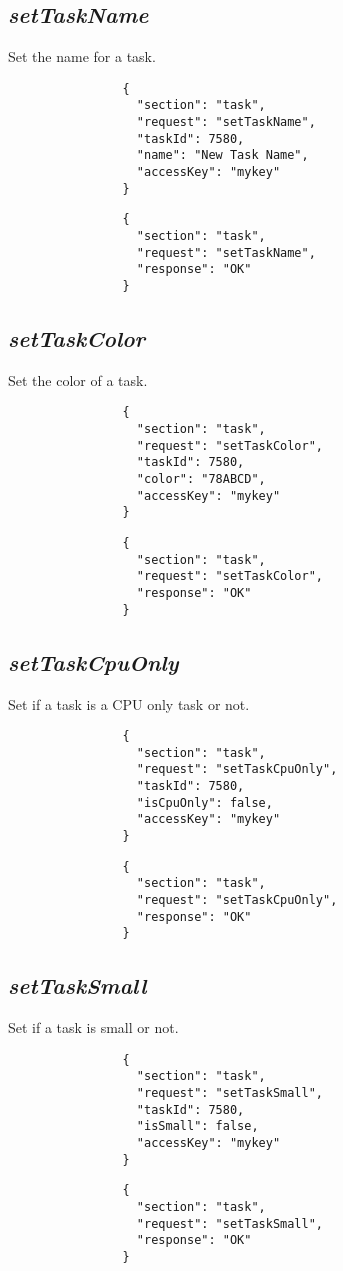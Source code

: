 		\subsection*{\textit{setTaskName}}
			Set the name for a task.
			{
				\color{blue}
				\begin{verbatim}
				{
				  "section": "task",
				  "request": "setTaskName",
				  "taskId": 7580,
				  "name": "New Task Name",
				  "accessKey": "mykey"
				}
				\end{verbatim}
			}
			{
				\color{OliveGreen}
				\begin{verbatim}
				{
				  "section": "task",
				  "request": "setTaskName",
				  "response": "OK"
				}
				\end{verbatim}
			}
		\subsection*{\textit{setTaskColor}}
			Set the color of a task.
			{
				\color{blue}
				\begin{verbatim}
				{
				  "section": "task",
				  "request": "setTaskColor",
				  "taskId": 7580,
				  "color": "78ABCD",
				  "accessKey": "mykey"
				}
				\end{verbatim}
			}
			{
				\color{OliveGreen}
				\begin{verbatim}
				{
				  "section": "task",
				  "request": "setTaskColor",
				  "response": "OK"
				}
				\end{verbatim}
			}
		\subsection*{\textit{setTaskCpuOnly}}
			Set if a task is a CPU only task or not.
			{
				\color{blue}
				\begin{verbatim}
				{
				  "section": "task",
				  "request": "setTaskCpuOnly",
				  "taskId": 7580,
				  "isCpuOnly": false,
				  "accessKey": "mykey"
				}
				\end{verbatim}
			}
			{
				\color{OliveGreen}
				\begin{verbatim}
				{
				  "section": "task",
				  "request": "setTaskCpuOnly",
				  "response": "OK"
				}
				\end{verbatim}
			}
		\subsection*{\textit{setTaskSmall}}
			Set if a task is small or not.
			{
				\color{blue}
				\begin{verbatim}
				{
				  "section": "task",
				  "request": "setTaskSmall",
				  "taskId": 7580,
				  "isSmall": false,
				  "accessKey": "mykey"
				}
				\end{verbatim}
			}
			{
				\color{OliveGreen}
				\begin{verbatim}
				{
				  "section": "task",
				  "request": "setTaskSmall",
				  "response": "OK"
				}
				\end{verbatim}
			}
